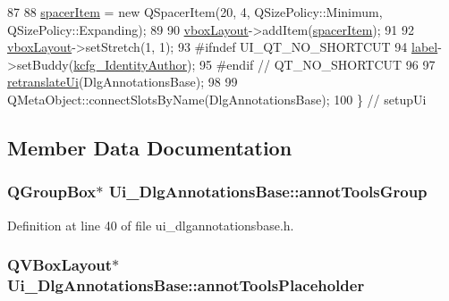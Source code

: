 \begin{DoxyCode}
87 
88         \hyperlink{classUi__DlgAnnotationsBase_a8c085f70a0a6631a9ebec265195f89f0}{spacerItem} = \textcolor{keyword}{new} QSpacerItem(20, 4, QSizePolicy::Minimum, QSizePolicy::Expanding);
89 
90         \hyperlink{classUi__DlgAnnotationsBase_a3cca923483f98ed4e4002f2449f2d493}{vboxLayout}->addItem(\hyperlink{classUi__DlgAnnotationsBase_a8c085f70a0a6631a9ebec265195f89f0}{spacerItem});
91 
92         \hyperlink{classUi__DlgAnnotationsBase_a3cca923483f98ed4e4002f2449f2d493}{vboxLayout}->setStretch(1, 1);
93 \textcolor{preprocessor}{#ifndef UI\_QT\_NO\_SHORTCUT}
94         \hyperlink{classUi__DlgAnnotationsBase_ae41f677019efd58f0974f5e829324cd2}{label}->setBuddy(\hyperlink{classUi__DlgAnnotationsBase_a31e52a2794f81e8ca7aa944cadb58b57}{kcfg\_IdentityAuthor});
95 \textcolor{preprocessor}{#endif // QT\_NO\_SHORTCUT}
96 
97         \hyperlink{classUi__DlgAnnotationsBase_ae7015323b8a7199ad8daf9fd730761b7}{retranslateUi}(DlgAnnotationsBase);
98 
99         QMetaObject::connectSlotsByName(DlgAnnotationsBase);
100     \} \textcolor{comment}{// setupUi}
\end{DoxyCode}


\subsection{Member Data Documentation}
\hypertarget{classUi__DlgAnnotationsBase_aef6cc8b1de7c7dbf6d4100f2f371bb77}{
\subsubsection[{annot\+Tools\+Group}]{\setlength{\rightskip}{0pt plus 5cm}Q\+Group\+Box$\ast$ Ui\+\_\+\+Dlg\+Annotations\+Base\+::annot\+Tools\+Group}}\label{classUi__DlgAnnotationsBase_aef6cc8b1de7c7dbf6d4100f2f371bb77}


Definition at line 40 of file ui\+\_\+dlgannotationsbase.\+h.

\hypertarget{classUi__DlgAnnotationsBase_a87373fcbb302ebee34dce288e76b7bec}{
\subsubsection[{annot\+Tools\+Placeholder}]{\setlength{\rightskip}{0pt plus 5cm}Q\+V\+Box\+Layout$\ast$ Ui\+\_\+\+Dlg\+Annotations\+Base\+::annot\+Tools\+Placeholder}}\label{classUi__DlgAnnotationsBase_a87373fcbb302ebee34dce288e76b7bec}


